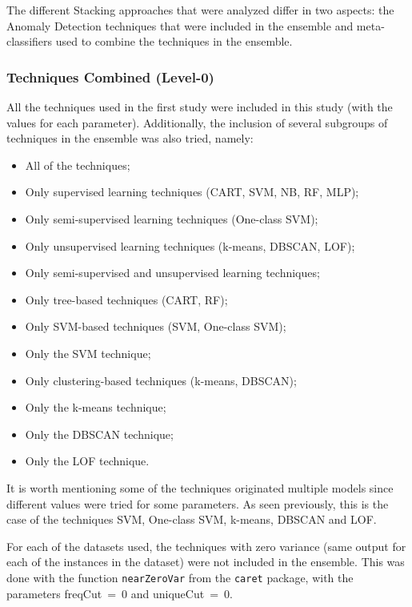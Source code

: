 The different Stacking approaches that were analyzed differ in two aspects: the Anomaly Detection techniques that were included in the ensemble and meta-classifiers used to combine the techniques in the ensemble.

\subsubsection{Techniques Combined (Level-0)}\label{sec:techniques_combinated}

All the techniques used in the first study were included in this study (with the values for each parameter).
Additionally, the inclusion of several subgroups of techniques in the ensemble was also tried, namely:

\begin{itemize}
	\item All of the techniques;
	\item Only supervised learning techniques (CART, SVM, NB, RF, MLP);
	\item Only semi-supervised learning techniques (One-class SVM);
	\item Only unsupervised learning techniques (k-means, DBSCAN, LOF);
	\item Only semi-supervised and unsupervised learning techniques;
	\item Only tree-based techniques (CART, RF);
	\item Only SVM-based techniques (SVM, One-class SVM);
	\item Only the SVM technique;
	\item Only clustering-based techniques (k-means, DBSCAN);
	\item Only the k-means technique;
	\item Only the DBSCAN technique;
	\item Only the LOF technique.
\end{itemize}

It is worth mentioning some of the techniques originated multiple models since different values were tried for some parameters.
As seen previously, this is the case of the techniques SVM, One-class SVM, k-means, DBSCAN and LOF.

For each of the datasets used, the techniques with zero variance (same output for each of the instances in the dataset) were not included in the ensemble.
This was done with the function \verb|nearZeroVar| from the \verb|caret| package, with the parameters freqCut~=~0 and uniqueCut~=~0.

